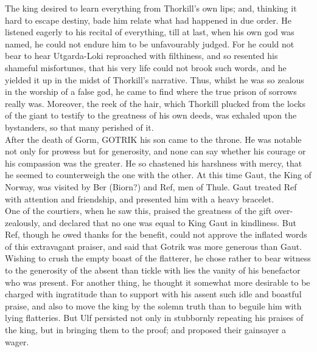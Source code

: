 \documentclass[10pt,a4paper]{report}
\begin{document}
The king desired to learn everything from Thorkill's own lips; and, thinking it hard to escape destiny, bade him relate what had happened in due order. He listened eagerly to his recital of everything, till at last, when his own god was named, he could not endure him to be unfavourably judged. For he could not bear to hear Utgarda-Loki reproached with filthiness, and so resented his shameful misfortunes, that his very life could not brook such words, and he yielded it up in the midst of Thorkill's narrative. Thus, whilst he was so zealous in the worship of a false god, he came to find where the true prison of sorrows really was. Moreover, the reek of the hair, which Thorkill plucked from the locks of the giant to testify to the greatness of his own deeds, was exhaled upon the bystanders, so that many perished of it.\\

After the death of Gorm, GOTRIK his son came to the throne. He was notable not only for prowess but for generosity, and none can say whether his courage or his compassion was the greater. He so chastened his harshness with mercy, that he seemed to counterweigh the one with the other. At this time Gaut, the King of Norway, was visited by Ber (Biorn?) and Ref, men of Thule. Gaut treated Ref with attention and friendship, and presented him with a heavy bracelet.\\

One of the courtiers, when he saw this, praised the greatness of the gift over-zealously, and declared that no one was equal to King Gaut in kindliness. But Ref, though he owed thanks for the benefit, could not approve the inflated words of this extravagant praiser, and said that Gotrik was more generous than Gaut. Wishing to crush the empty boast of the flatterer, he chose rather to bear witness to the generosity of the absent than tickle with lies the vanity of his benefactor who was present. For another thing, he thought it somewhat more desirable to be charged with ingratitude than to support with his assent such idle and boastful praise, and also to move the king by the solemn truth than to beguile him with lying flatteries. But Ulf persisted not only in stubbornly repeating his praises of the king, but in bringing them to the proof; and proposed their gainsayer a wager.\\
\end{document}
